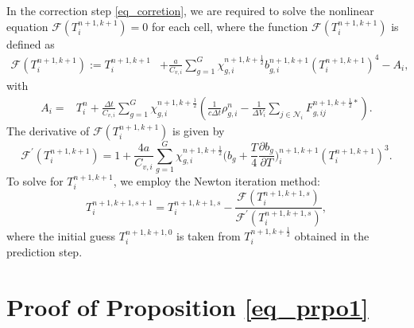 \documentclass[preprint,12pt]{elsarticle}
\theoremstyle{definition}
\theoremstyle{plain}
\numberwithin{equation}{section}
\numberwithin{algorithm}{section}
\newcounter{eq_count}
\newcounter{thm_count}
\newcounter{fig_count}
\newcounter{tab_count}
\newcounter{alg_count}
\let\OldSection\section
\renewcommand{\section}{
    \setcounter{eq_count}{0}
    \setcounter{thm_count}{0}
    \setcounter{fig_count}{0}
    \setcounter{tab_count}{0}
    \setcounter{alg_count}{0}
    \OldSection
}
\newcommand{\half}{\frac{1}{2}}
\begin{document}
	In the correction step \eqref{eq_corretion}, we are required to solve the nonlinear equation $\mathcal{F}(T^{n+1,k+1}_i) = 0$ for each cell, where the function $\mathcal{F}(T^{n+1,k+1}_i)$ is defined as
\begin{equation}
	\begin{aligned}
		\mathcal{F}(T^{n+1,k+1}_i) := T_i^{n+1,k+1} &+ \frac{ a}{C_{v,i}} \sum_{g=1}^G \chi_{g,i}^{n+1,k+\half} b_{g,i}^{n+1,k+1}  (T_i^{n+1,k+1})^4 -A_i,
	\end{aligned}
\end{equation}
	with
\begin{equation}
	\begin{aligned}
		A_i  =&   T_i^n + \frac{\Delta t}{C_{v,i}} \sum_{g=1}^G \chi_{g,i}^{n+1, k+ \half}\left( \frac{1}{c \Delta t} \rho_{g,i}^n- \frac{1}{\Delta V_i}  \sum_{j \in \mathcal{N}_i} 
		F_{g,ij}^{n+1,k+\half*} \right).
	\end{aligned}
\end{equation}
The derivative of $\mathcal{F}(T^{n+1,k+1}_i)$ is given by 
\begin{equation}  
            \mathcal{F}^{'}(T^{n+1,k+1}_i) = 1 + \frac{ 4a}{C_{v,i}} \sum_{g=1}^G \chi_{g,i}^{n+1,k+\half} \Big( b_g+\frac{T}{4}\frac{\partial b_g}{\partial T} \Big)_{i}^{n+1,k+1}   (T_{i}^{n+1,k+1})^3.
\end{equation}
To solve for $T^{n+1,k+1}_i$, we employ the Newton iteration method:
\begin{equation}
    T^{n+1,k+1,s+1}_i =  T^{n+1,k+1,s}_i - \frac{\mathcal{F}(T^{n+1,k+1,s}_i)}{\mathcal{F}^{'}(T^{n+1,k+1,s}_i)},
\end{equation}
where the initial guess $T_i^{n+1,k+1,0}$ is taken from $T_i^{n+1,k+\frac{1}{2}}$ obtained in the prediction step.

\section{Proof of Proposition \ref{eq_prpo1} }
\end{document}
